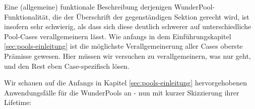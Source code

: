 
Eine (allgemeine) funktionale Beschreibung derjenigen WunderPool-Funktionalität, die der Überschrift der gegenständigen Sektion gerecht wird, ist insofern sehr schwierig, als dass sich diese deutlich schwerer auf unterschiedliche Pool-Cases verallgemeinern lässt. Wie anfangs in dem Einführungskapitel \ref{sec:pools-einleitung} ist die möglichste Verallgemeinerung aller Cases oberste Prämisse gewesen. Hier müssen wir versuchen zu verallgemeinern, was nur geht, und den Rest eben Case-spezifisch lösen. 

\vspace{0.1cm}

Wir schauen auf die Anfangs in Kapitel \ref{sec:pools-einleitung} hervorgehobenen Anwendungsfälle für die WunderPools an - nun mit kurzer Skizzierung ihrer Lifetime:

